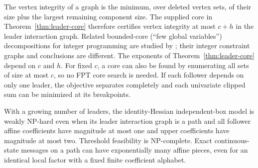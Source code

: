 The vertex integrity of a graph is the minimum, over deleted vertex sets, of
their size plus the largest remaining component size. The supplied core in
Theorem~\ref{thm:leader-core} therefore certifies vertex integrity at most
\(c+h\) in the leader interaction graph. Related bounded-core (``few global
variables'') decompositions for integer programming are studied by \citet{DvorakEtAl2021};
their integer constraint graphs and conclusions are different. The exponents of
Theorem~\ref{thm:leader-core} depend on \(c\) and \(h\). For fixed \(c\), a core can also be found by
enumerating all sets of size at most \(c\), so no FPT core search is needed. If each follower depends on only one leader, the objective
separates completely and each univariate clipped sum can be minimized at its
breakpoints.

\begin{theorem}\label{thm:leader-path}
With a growing number of leaders, the identity-Hessian independent-box model
is weakly NP-hard even when its leader interaction graph is a path and all
follower affine coefficients have magnitude at most one and upper coefficients
have magnitude at most two. Threshold feasibility is NP-complete. Exact
continuous-state messages on a path can have exponentially many affine pieces,
even for an identical local factor with a fixed finite coefficient alphabet.
\end{theorem}
